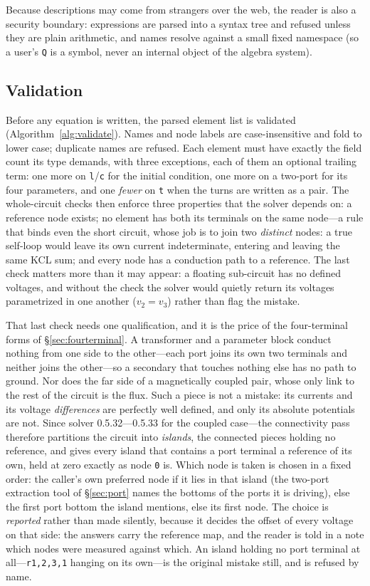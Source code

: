 \documentclass[11pt,oneside]{report}
\newcommand{\code}[1]{\texttt{#1}}
\begin{document}
Because descriptions may come from strangers over the web, the reader
is also a security boundary: expressions are parsed into a syntax tree
and refused unless they are plain arithmetic, and names resolve
against a small fixed namespace (so a user's \code{Q} is a symbol,
never an internal object of the algebra system).

\subsection{Validation}
\label{sec:validation}

Before any equation is written, the parsed element list is validated
(Algorithm~\ref{alg:validate}). Names and node labels are
case-insensitive and fold to lower case; duplicate names are refused.
Each element must have exactly the field count its type demands, with
three exceptions, each of them an optional trailing term: one more on
\code{l}/\code{c} for the initial condition, one more on a two-port
for its four parameters, and one \emph{fewer} on \code{t} when the
turns are written as a pair. The whole-circuit checks then enforce
three properties that the solver
depends on: a reference node exists; no element has both its
terminals on the same node---a rule that binds even the short
circuit, whose job is to join two \emph{distinct} nodes: a true
self-loop would leave its own current indeterminate, entering and
leaving the same KCL sum; and every node has a conduction path to
a reference. The last check matters more than it may appear: a
floating sub-circuit has no defined voltages, and without the check
the solver would quietly return its voltages parametrized in one
another ($v_2 = v_3$) rather than flag the mistake.

That last check needs one qualification, and it is the price of the
four-terminal forms of \S\ref{sec:fourterminal}. A transformer and a
parameter block conduct nothing from one side to the other---each port
joins its own two terminals and neither joins the other---so a
secondary that touches nothing else has no path to ground. Nor does
the far side of a magnetically coupled pair, whose only link to the
rest of the circuit is the flux. Such a piece is not a mistake: its
currents and its voltage \emph{differences} are perfectly well
defined, and only its absolute potentials are not. Since solver
0.5.32---0.5.33 for the coupled case---the connectivity pass therefore
partitions the circuit into \emph{islands}, the connected pieces
holding no reference, and gives every island that contains a port
terminal a reference of its own, held at zero exactly as node
\code{0} is. Which node is taken is chosen in a fixed order: the
caller's own preferred node if it lies in that island (the two-port
extraction tool of \S\ref{sec:port} names the bottoms of the ports it
is driving), else the first port bottom the island mentions, else its
first node. The choice is \emph{reported} rather than made silently,
because it decides the offset of every voltage on that side: the
answers carry the reference map, and the reader is told in a note
which nodes were measured against which. An island holding no port
terminal at all---\code{r1,2,3,1} hanging on its own---is the original
mistake still, and is refused by name.
\end{document}
